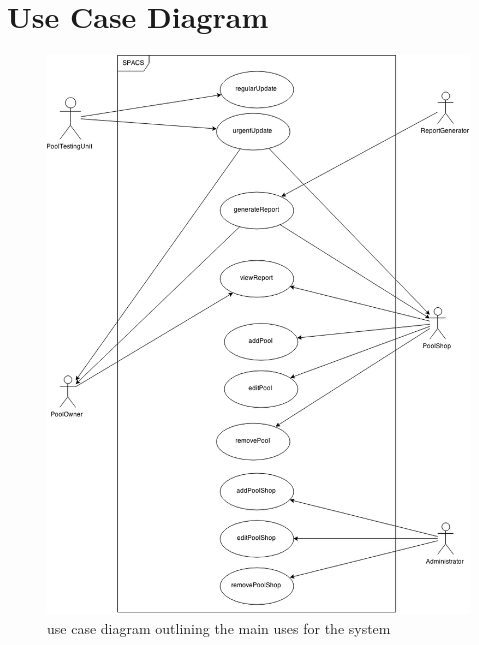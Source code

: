 \newcommand{\usecase}[7]{
\begin{center}
\begin{tabular}[h!]{| l | p{12cm} |}
	\hline
	\textbf{Name} & #1 \\ \hline
	\textbf{Actors} & #2 \\ \hline
	\textbf{Goal} & #3 \\ \hline
	\textbf{Preconditions} & #4 \\ \hline
	\textbf{Basic Flow} & #5 \\ \hline
	\textbf{Alternative Flow} & #6 \\ \hline
	\textbf{Postconditions} & #7 \\ \hline
\end{tabular}
\end{center}
}

\section{Use Case Diagram}

\begin{figure}[h!]
\begin{center}
	\includegraphics[width=15cm]{images/UseCaseDiagram}
	\caption{use case diagram outlining the main uses for the system}
\end{center}
\end{figure}


